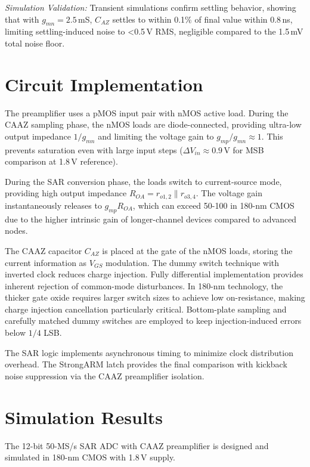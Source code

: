 \documentclass[journal]{IEEEtran}
\begin{document}
\textit{Simulation Validation:} Transient simulations confirm settling behavior, showing that with $g_{mn} = 2.5$\,mS, $C_{AZ}$ settles to within 0.1\% of final value within 0.8\,ns, limiting settling-induced noise to <0.5\,\textmu V RMS, negligible compared to the 1.5\,mV total noise floor.

\section{Circuit Implementation}
The preamplifier uses a pMOS input pair with nMOS active load. During the CAAZ sampling phase, the nMOS loads are diode-connected, providing ultra-low output impedance $1/g_{mn}$ and limiting the voltage gain to $g_{mp}/g_{mn} \approx 1$. This prevents saturation even with large input steps ($\Delta V_{in} \approx 0.9$\,V for MSB comparison at 1.8\,V reference).

During the SAR conversion phase, the loads switch to current-source mode, providing high output impedance $R_{OA} = r_{o1,2} \parallel r_{o3,4}$. The voltage gain instantaneously releases to $g_{mp}R_{OA}$, which can exceed 50-100 in 180-nm CMOS due to the higher intrinsic gain of longer-channel devices compared to advanced nodes.

The CAAZ capacitor $C_{AZ}$ is placed at the gate of the nMOS loads, storing the current information as $V_{GS}$ modulation. The dummy switch technique with inverted clock reduces charge injection. Fully differential implementation provides inherent rejection of common-mode disturbances. In 180-nm technology, the thicker gate oxide requires larger switch sizes to achieve low on-resistance, making charge injection cancellation particularly critical. Bottom-plate sampling and carefully matched dummy switches are employed to keep injection-induced errors below $1/4$ LSB.

The SAR logic implements asynchronous timing to minimize clock distribution overhead. The StrongARM latch provides the final comparison with kickback noise suppression via the CAAZ preamplifier isolation.

\section{Simulation Results}
The 12-bit 50-MS/s SAR ADC with CAAZ preamplifier is designed and simulated in 180-nm CMOS with 1.8\,V supply.
\end{document}
